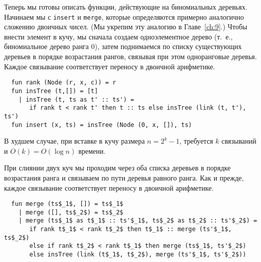 Теперь мы готовы описать функции, действующие на биномиальных
деревьях. Начинаем мы с \lstinline!insert! и \lstinline!merge!,
которые определяются примерно аналогично сложению двоичных чисел. (Мы
укрепим эту аналогию в Главе~\ref{ch:9}.) Чтобы внести элемент в кучу,
мы сначала создаем одноэлементное дерево (т.~е., биномиальное дерево
ранга 0), затем поднимаемся по списку существующих деревьев в порядке
возрастания рангов, связывая при этом одноранговые деревья. Каждое
связывание соответствует переносу в двоичной арифметике.
\begin{lstlisting}
  fun rank (Node (r, x, c)) = r
  fun insTree (t,[]) = [t]
    | insTree (t, ts as t' :: ts') =
       if rank t < rank t' then t :: ts else insTree (link (t, t'), ts')
  fun insert (x, ts) = insTree (Node (0, x, []), ts)
\end{lstlisting}
В худшем случае, при вставке в кучу размера $n = 2^k -1$, требуется
$k$ связываний и $O(k) = O(\log n)$ времени.

При слиянии двух куч мы проходим через оба списка деревьев в порядке
возрастания ранга и связываем по пути деревья равного ранга. Как и
прежде, каждое связывание соответствует переносу в двоичной
арифметике.
\begin{lstlisting}
  fun merge (ts$_1$, []) = ts$_1$
    | merge ([], ts$_2$) = ts$_2$
    | merge (ts$_1$ as t$_1$ :: ts'$_1$, ts$_2$ as t$_2$ :: ts'$_2$) =
       if rank t$_1$ < rank t$_2$ then t$_1$ :: merge (ts'$_1$, ts$_2$)
       else if rank t$_2$ < rank t$_1$ then merge (ts$_1$, ts'$_2$)
       else insTree (link (t$_1$, t$_2$), merge (ts'$_1$, ts'$_2$))
\end{lstlisting}

